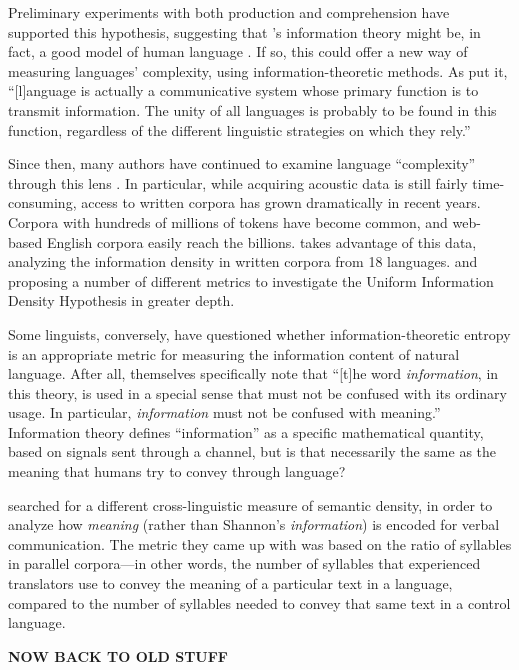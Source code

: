\documentclass[12pt,twoside]{article}
\begin{document}
Preliminary experiments with both production and comprehension have supported this hypothesis, suggesting that \citeauthor{shannon}'s information theory might be, in fact, a good model of human language \parencites[29]{jaeger}[970-971]{meister}. If so, this could offer a new way of measuring languages' complexity, using information-theoretic methods. As \citet[539]{pellegrino} put it, ``[l]anguage is actually a communicative system whose primary function is to transmit information. The unity of all languages is probably to be found in this function, regardless of the different linguistic strategies on which they rely.''

Since then, many authors have continued to examine language ``complexity'' through this lens \citep{pellegrino,oh,coupé}. In particular, while acquiring acoustic data is still fairly time-consuming, access to written corpora has grown dramatically in recent years. Corpora with hundreds of millions of tokens have become common, and web-based English corpora easily reach the billions. \citet{oh} takes advantage of this data, analyzing the information density in written corpora from 18 languages. and proposing a number of different metrics to investigate the Uniform Information Density Hypothesis in greater depth.

Some linguists, conversely, have questioned whether information-theoretic entropy is an appropriate metric for measuring the information content of natural language. After all, \citet[8]{shannon} themselves specifically note that ``[t]he word \emph{information}, in this theory, is used in a special sense that must not be confused with its ordinary usage. In particular, \emph{information} must not be confused with meaning.'' Information theory defines ``information'' as a specific mathematical quantity, based on signals sent through a channel, but is that necessarily the same as the meaning that humans try to convey through language?

\citet{pellegrino} searched for a different cross-linguistic measure of semantic density, in order to analyze how \emph{meaning} (rather than Shannon's \emph{information}) is encoded for verbal communication. The metric they came up with was based on the ratio of syllables in parallel corpora---in other words, the number of syllables that experienced translators use to convey the meaning of a particular text in a language, compared to the number of syllables needed to convey that same text in a control language.

\textbf{NOW BACK TO OLD STUFF}
\end{document}
